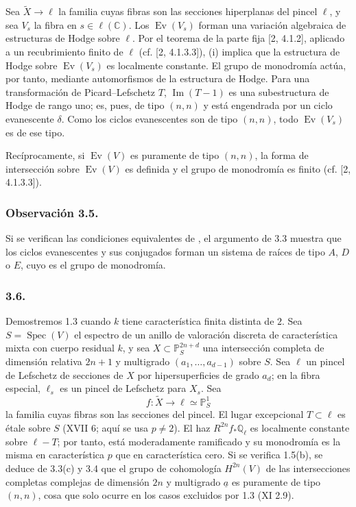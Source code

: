 Sea $\widetilde X\to\ell$ la familia cuyas fibras son las secciones
hiperplanas del pincel $\ell$, y sea $V_s$ la fibra en
$s\in\ell(\mathbb C)$. Los $\operatorname{Ev}(V_s)$ forman una
variación algebraica de estructuras de Hodge sobre $\ell$. Por el
teorema de la parte fija [2, 4.1.2], aplicado a un recubrimiento finito
de $\ell$ (cf. [2, 4.1.3.3]), (i) implica que la estructura de Hodge
sobre $\operatorname{Ev}(V_s)$ es localmente constante. El grupo de
monodromía actúa, por tanto, mediante automorfismos de la estructura de
Hodge. Para una transformación de Picard--Lefschetz $T$,
$\operatorname{Im}(T-1)$ es una subestructura de Hodge de rango uno;
es, pues, de tipo $(n,n)$ y está engendrada por un ciclo evanescente
$\delta$. Como los ciclos evanescentes son de tipo $(n,n)$, todo
$\operatorname{Ev}(V_s)$ es de ese tipo.

Recíprocamente, si $\operatorname{Ev}(V)$ es puramente de tipo $(n,n)$,
la forma de intersección sobre $\operatorname{Ev}(V)$ es definida y el
grupo de monodromía es finito (cf. [2, 4.1.3.3]).

\pageoriginale

\subsubsection*{Observación 3.5.}

Si se verifican las condiciones equivalentes de , el argumento de
3.3 muestra que los ciclos evanescentes y sus conjugados forman un
sistema de raíces de tipo $A$, $D$ o $E$, cuyo
 es el grupo de monodromía.

\subsubsection*{3.6.}

Demostremos 1.3 cuando $k$ tiene característica finita distinta de
$2$. Sea $S=\operatorname{Spec}(V)$ el espectro de
un anillo de valoración discreta de característica mixta con cuerpo
residual $k$, y sea
$X\subset\mathbb P_S^{2n+d}$ una intersección completa de dimensión
relativa $2n+1$ y multigrado $(a_1,\ldots,a_{d-1})$ sobre $S$. Sea
$\ell$ un pincel de Lefschetz de secciones de $X$ por
hipersuperficies de grado $a_d$; en la fibra especial, $\ell_s$ es un
pincel de Lefschetz para $X_s$. Sea
\[
f:\widetilde X\longrightarrow\ell\simeq\mathbb P^1_S
\]
la familia cuyas fibras son las secciones del pincel. El lugar
excepcional $T\subset\ell$ es étale sobre $S$ (XVII 6; aquí se usa
$p\ne2$). El haz $R^{2n}f_*\mathbb Q_\ell$ es localmente constante
sobre $\ell-T$; por tanto, está moderadamente ramificado y su
monodromía es la misma en característica $p$ que en característica
cero. Si se verifica 1.5(b), se deduce de 3.3(c) y 3.4 que el grupo de
cohomología $H^{2n}(V)$ de las intersecciones completas complejas de
dimensión $2n$ y multigrado $\underline a$ es puramente de tipo
$(n,n)$, cosa que solo ocurre en los casos excluidos por 1.3
(XI 2.9).

